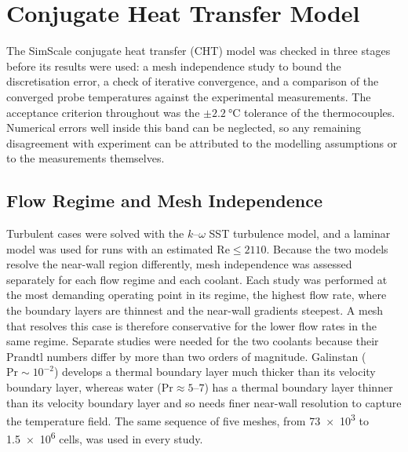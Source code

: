 
\chapter{Conjugate Heat Transfer Model}
\label{app:cht_validation}

The SimScale conjugate heat transfer (CHT) model was checked in three stages
before its results were used: a mesh independence study to bound the
discretisation error, a check of iterative convergence, and a comparison of the
converged probe temperatures against the experimental measurements. The
acceptance criterion throughout was the $\pm\SI{2.2}{\celsius}$ tolerance of the
thermocouples. Numerical errors well inside this band can be neglected, so any
remaining disagreement with experiment can be attributed to the modelling
assumptions or to the measurements themselves.

\section{Flow Regime and Mesh Independence}

Turbulent cases were solved with the $k$--$\omega$ SST turbulence model, and a
laminar model was used for runs with an estimated $\mathrm{Re} \leq 2110$.
Because the two models resolve the near-wall region differently, mesh
independence was assessed separately for each flow regime and each coolant.
Each study was performed at the most demanding operating point in its regime,
the highest flow rate, where the boundary layers are thinnest and the near-wall
gradients steepest. A mesh that resolves this case is therefore conservative for
the lower flow rates in the same regime. Separate studies were needed for the
two coolants because their Prandtl numbers differ by more than two orders of
magnitude. Galinstan ($\mathrm{Pr} \sim 10^{-2}$) develops a thermal boundary
layer much thicker than its velocity boundary layer, whereas water
($\mathrm{Pr} \approx 5$--$7$) has a thermal boundary layer thinner than its
velocity boundary layer and so needs finer near-wall resolution to capture the
temperature field. The same sequence of five meshes, from \num{73e3} to
\num{1.5e6} cells, was used in every study.

